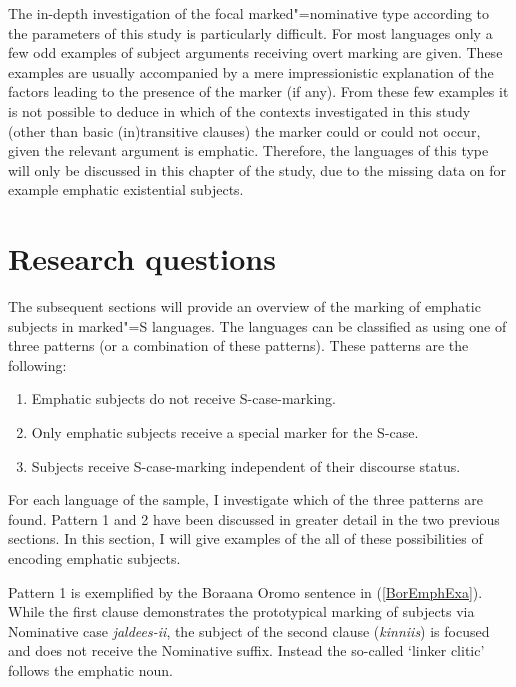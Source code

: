 The in-depth investigation of the focal marked"=nominative type according to the parameters of this study is particularly difficult. 
For most languages only a few odd examples of subject arguments receiving overt marking are given. 
These examples are usually accompanied by a mere impressionistic explanation of the factors leading to the presence of the marker (if any). 
From these few examples it is not possible to deduce in which of the contexts investigated in this study (other than basic (in)transitive clauses) the marker could or could not occur, given the relevant argument is emphatic. 
Therefore, the languages of this type will only be discussed in this chapter of the study, due to the missing data on for example emphatic existential subjects.


\section{Research questions}\label{EmphQuest}

The subsequent sections will provide an overview of the marking of emphatic subjects in marked"=S languages.
The languages can be classified as using one of three patterns (or a combination of these patterns).
These patterns are the following: 

\begin{enumerate}
\item Emphatic subjects do not receive S-case-marking.
\item Only emphatic subjects receive a special marker for the S-case.
\item Subjects receive S-case-marking independent of their discourse status.
\end{enumerate}

For each language of the sample, I investigate which of the three patterns are found.
Pattern 1 and 2 have been discussed in greater detail in the two previous sections.
In this section, I will give examples of the all of these possibilities of encoding emphatic subjects. 

Pattern 1 is exemplified by the Boraana Oromo sentence in (\ref{BorEmphExa}). 
While the first clause demonstrates the prototypical marking of subjects via Nominative case \emph{jaldees-ii}, the subject of the second clause (\emph{kinniis}) is focused and does not receive the Nominative suffix. Instead the so-called `linker clitic'  follows the emphatic noun.

